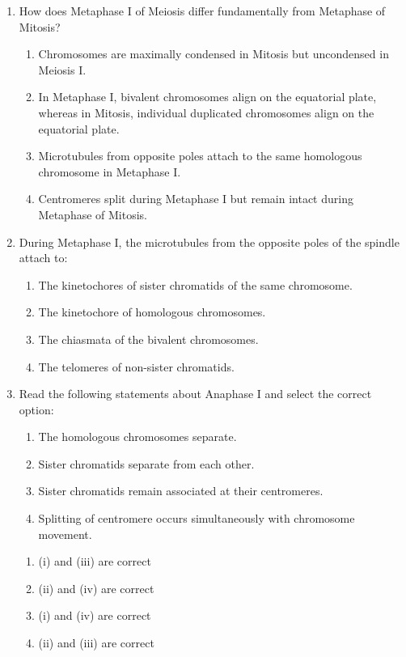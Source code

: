 \documentclass[11pt,a4paper]{article}
\begin{document}
\begin{enumerate}[label=\textbf{\arabic*.}]
\item How does Metaphase I of Meiosis differ fundamentally from Metaphase of Mitosis?
\begin{enumerate}[label=(\Alph*)]
    \item Chromosomes are maximally condensed in Mitosis but uncondensed in Meiosis I.
    \item In Metaphase I, bivalent chromosomes align on the equatorial plate, whereas in Mitosis, individual duplicated chromosomes align on the equatorial plate.
    \item Microtubules from opposite poles attach to the same homologous chromosome in Metaphase I.
    \item Centromeres split during Metaphase I but remain intact during Metaphase of Mitosis.
\end{enumerate}

\item During Metaphase I, the microtubules from the opposite poles of the spindle attach to:
\begin{enumerate}[label=(\Alph*)]
    \item The kinetochores of sister chromatids of the same chromosome.
    \item The kinetochore of homologous chromosomes.
    \item The chiasmata of the bivalent chromosomes.
    \item The telomeres of non-sister chromatids.
\end{enumerate}

\item Read the following statements about Anaphase I and select the correct option:
\begin{enumerate}[label=(\roman*)]
    \item The homologous chromosomes separate.
    \item Sister chromatids separate from each other.
    \item Sister chromatids remain associated at their centromeres.
    \item Splitting of centromere occurs simultaneously with chromosome movement.
\end{enumerate}
\begin{enumerate}[label=(\Alph*)]
    \item (i) and (iii) are correct
    \item (ii) and (iv) are correct
    \item (i) and (iv) are correct
    \item (ii) and (iii) are correct
\end{enumerate}


\end{enumerate}
\end{document}
